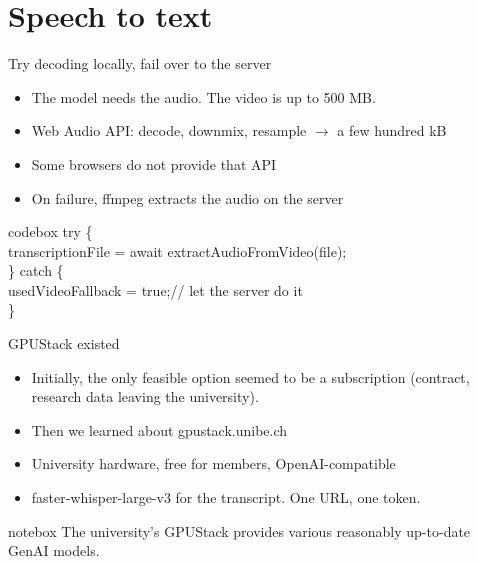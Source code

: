 \documentclass[aspectratio=169,11pt]{beamer}
\newenvironment{codebox}
  {\begin{beamercolorbox}[wd=\dimexpr\textwidth-16pt\relax,sep=7pt]{codebox}\ttfamily\footnotesize}
  {\end{beamercolorbox}}
\newenvironment{notebox}
  {\begin{beamercolorbox}[wd=\dimexpr\textwidth-16pt\relax,sep=8pt]{notebox}\small}
  {\end{beamercolorbox}}
\newcommand{\key}[1]{{\color{ubBlue}\ttfamily #1}}
\begin{document}
\section{Speech to text}

\begin{frame}{Try decoding locally, fail over to the server}
  \begin{itemize}\setlength\itemsep{0.55em}
    \item The model needs the audio. The video is up to 500 MB.
    \item Web Audio API: decode, downmix, resample $\rightarrow$ a few hundred kB
    \item Some browsers do not provide that API
    \item On failure, \key{ffmpeg} extracts the audio on the server
  \end{itemize}
  \vspace{0.6em}
  \begin{codebox}
    \color{ubMuted}try \{\color{ubText}\\
    \hspace*{1em}transcriptionFile = await extractAudioFromVideo(file);\\
    \color{ubMuted}\} catch \{\color{ubText}\\
    \hspace*{1em}usedVideoFallback = true;\hspace*{1em}\color{ubMuted}// let the server do it\color{ubText}\\
    \color{ubMuted}\}
  \end{codebox}
\end{frame}

\begin{frame}{GPUStack existed}
  \begin{itemize}\setlength\itemsep{0.8em}
    \item Initially, the only feasible option seemed to be a subscription (contract, research data leaving the university).
    \item Then we learned about \key{gpustack.unibe.ch}
    \item University hardware, free for members, OpenAI-compatible
    \item \key{faster-whisper-large-v3} for the transcript. One URL, one token.
  \end{itemize}
  \vspace{1.0em}
  \begin{notebox}
    The university's GPUStack provides various reasonably up-to-date GenAI models.
  \end{notebox}
\end{frame}
\end{document}
